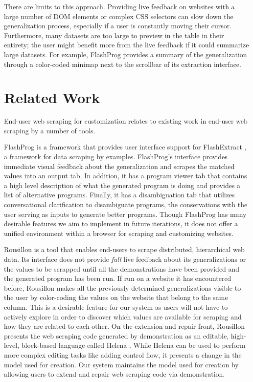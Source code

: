 \documentclass[sigconf,10pt]{acmart}
\begin{document}
There are limits to this approach. Providing live feedback on websites
with a large number of DOM elements or complex CSS selectors can slow
down the generalization process, especially if a user is constantly
moving their cursor. Furthermore, many datasets are too large to preview
in the table in their entirety; the user might benefit more from the
live feedback if it could summarize large datasets. For example,
FlashProg provides a summary of the generalization through a color-coded
minimap next to the scrollbar of its extraction interface.

\hypertarget{sec:related-work}{%
\section{Related Work}\label{sec:related-work}}

End-user web scraping for customization relates to existing work in
end-user web scraping by a number of tools.

FlashProg \citep{mayer2015} is a framework that provides user interface
support for FlashExtract \citep{le2014}, a framework for data scraping
by examples. FlashProg's interface provides immediate visual feedback
about the generalization and scrapes the matched values into an output
tab. In addition, it has a program viewer tab that contains a high level
description of what the generated program is doing and provides a list
of alternative programs. Finally, it has a disambiguation tab that
utilizes conversational clarification to disambiguate programs, the
conservations with the user serving as inputs to generate better
programs. Though FlashProg has many desirable features we aim to
implement in future iterations, it does not offer a unified environment
within a browser for scraping and customizing websites.

Rousillon \citep{chasins2018} is a tool that enables end-users to scrape
distributed, hierarchical web data. Its interface does not provide
\emph{full} live feedback about its generalizations or the values to be
scrapped until all the demonstrations have been provided and the
generated program has been run. If run on a website it has encountered
before, Rousillon makes all the previously determined generalizations
visible to the user by color-coding the values on the website that
belong to the same column. This is a desirable feature for our system as
users will not have to actively explore in order to discover which
values are available for scraping and how they are related to each
other. On the extension and repair front, Rousillon presents the web
scraping code generated by demonstration as an editable, high-level,
block-based language called Helena \citep{zotero-51}. While Helena can
be used to perform more complex editing tasks like adding control flow,
it presents a change in the model used for creation. Our system
maintains the model used for creation by allowing users to extend and
repair web scraping code via demonstration.
\end{document}
